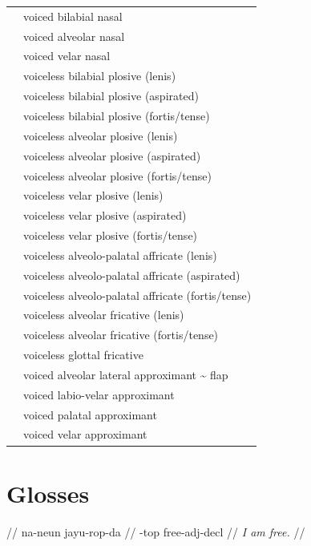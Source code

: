 \documentclass{article}
\begin{document}
\begin{xltabular}{\textwidth}{lL}
   & voiced bilabial nasal \\
   & voiced alveolar nasal \\
   & voiced velar nasal \\
   & voiceless bilabial plosive (lenis) \\
   & voiceless bilabial plosive (aspirated) \\
   & voiceless bilabial plosive (fortis/tense) \\
   & voiceless alveolar plosive (lenis) \\
   & voiceless alveolar plosive (aspirated) \\
   & voiceless alveolar plosive (fortis/tense) \\
   & voiceless velar plosive (lenis) \\
   & voiceless velar plosive (aspirated) \\
   & voiceless velar plosive (fortis/tense) \\
   & voiceless alveolo-palatal affricate (lenis) \\
   & voiceless alveolo-palatal affricate (aspirated) \\
   & voiceless alveolo-palatal affricate (fortis/tense) \\
   & voiceless alveolar fricative (lenis) \\
   & voiceless alveolar fricative (fortis/tense) \\
   & voiceless glottal fricative \\
   & voiced alveolar lateral approximant \textasciitilde{} flap \\
   & voiced labio-velar approximant \\
   & voiced palatal approximant \\
  \ipa{\textturnmrleg} & voiced velar approximant \\
\end{xltabular}

\newpage\section{Glosses}

\ex
\begingl
\gla {}  //
\glb na-neun jayu-rop-da //
-{\sc top} free-{\sc adj}-{\sc decl} //
\glft \textit{I am free.} //
\endgl
\xe
\end{document}
